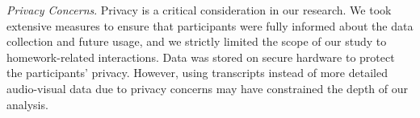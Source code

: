 \textit{Privacy Concerns}. Privacy is a critical consideration in our research. We took extensive measures to ensure that participants were fully informed about the data collection and future usage, and we strictly limited the scope of our study to homework-related interactions. Data was stored on secure hardware to protect the participants’ privacy. However, using transcripts instead of more detailed audio-visual data due to privacy concerns may have constrained the depth of our analysis.





